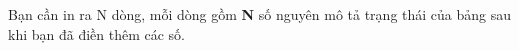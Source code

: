 Bạn cần in ra N dòng, mỗi dòng gồm \textbf{N} số nguyên mô tả trạng thái của bảng sau khi bạn đã điền thêm các số.